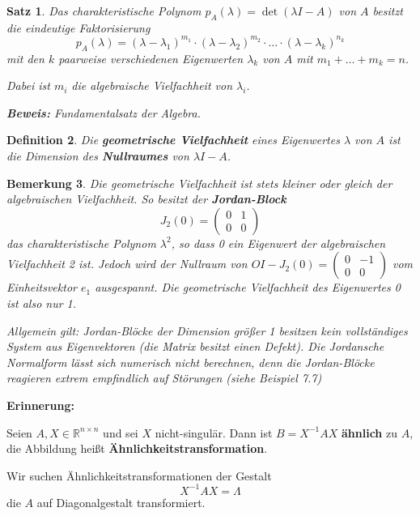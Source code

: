 \documentclass[%
a4paper,
11pt,		%
leqno,		%
]
{scrartcl}
\theoremstyle{plain}
\newtheorem{mydef}{Definition}[section]
\theoremstyle{plain}
\newtheorem{mysatz}[mydef]{Satz}
\theoremstyle{plain}
\newtheorem{mybem}[mydef]{Bemerkung}
\begin{document}
\begin{mysatz}
Das charakteristische Polynom $p_A(\lambda) = \det(\lambda I - A)$ von $A$ besitzt die eindeutige Faktorisierung
\[
p_A(\lambda) = (\lambda - \lambda_1)^{m_1} \cdot (\lambda - \lambda_2)^{m_2} \cdot \ldots \cdot (\lambda - \lambda_k)^{n_k}
\]
mit den $k$ paarweise verschiedenen Eigenwerten $\lambda_k$ von $A$ mit $m_1 + \ldots + m_k = n$.

Dabei ist $m_i$ die algebraische Vielfachheit von $\lambda_i$.\newline

\textbf{Beweis:} Fundamentalsatz der Algebra.
\end{mysatz}

\begin{mydef}
  Die \textbf{geometrische Vielfachheit} eines Eigenwertes $\lambda$ von $A$ ist die Dimension des \textbf{Nullraumes} von $\lambda I -A$.
\end{mydef}

\newpage

\begin{mybem}
Die geometrische Vielfachheit ist stets kleiner oder gleich der algebraischen Vielfachheit.
So besitzt der \textbf{Jordan-Block}
\[
J_2(0) = 
\begin{pmatrix}
0 & 1\\
0 & 0
\end{pmatrix}
\]
das charakteristische Polynom $\lambda^2$, so dass 0 ein Eigenwert der algebraischen Vielfachheit 2 ist. Jedoch wird der Nullraum von $OI - J_2(0) = \begin{pmatrix}
0 & -1\\
0 & 0
\end{pmatrix}$
vom Einheitsvektor $e_1$ ausgespannt.
Die geometrische Vielfachheit des Eigenwertes 0 ist also nur 1.

Allgemein gilt: Jordan-Blöcke der Dimension größer 1 besitzen kein vollständiges System aus Eigenvektoren (die Matrix besitzt einen \textit{Defekt}).
Die Jordansche Normalform lässt sich numerisch nicht berechnen, denn die Jordan-Blöcke reagieren extrem empfindlich auf Störungen (siehe Beispiel 7.7) %
\end{mybem}

\textbf{Erinnerung:}

Seien $A,X \in \mathbb{R}^{n \times n}$ und sei $X$ nicht-singulär. Dann ist $B=X^{-1}AX$ \textbf{ähnlich} zu $A$, die Abbildung heißt \textbf{Ähnlichkeitstransformation}.

Wir suchen Ähnlichkeitstransformationen der Gestalt
\[
X^{-1}AX = \Lambda
\]
die $A$ auf Diagonalgestalt transformiert.
\end{document}
